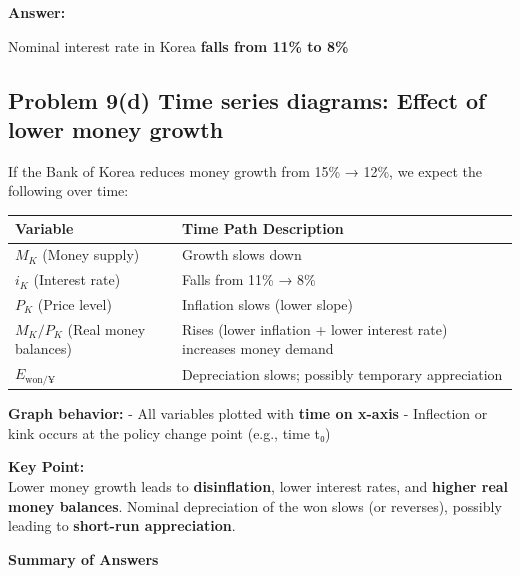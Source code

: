 \documentclass[
]{article}
\begin{document}
\textbf{Answer:}

Nominal interest rate in Korea \textbf{falls from 11\% to 8\%}

\subsection{Problem 9(d) Time series diagrams: Effect of lower money
growth}\label{problem-9d-time-series-diagrams-effect-of-lower-money-growth}

If the Bank of Korea reduces money growth from 15\% → 12\%, we expect
the following over time:

\begin{longtable}[]{@{}
  >{\raggedright\arraybackslash}p{}
  >{\raggedright\arraybackslash}p{}@{}}
\toprule\noalign{}
\begin{minipage}[b]{\linewidth}\raggedright
Variable
\end{minipage} & \begin{minipage}[b]{\linewidth}\raggedright
Time Path Description
\end{minipage} \\
\midrule\noalign{}
\endhead
\bottomrule\noalign{}
\endlastfoot
\(M_K\) (Money supply) & Growth slows down \\
\(i_K\) (Interest rate) & Falls from 11\% → 8\% \\
\(P_K\) (Price level) & Inflation slows (lower slope) \\
\(M_K / P_K\) (Real money balances) & Rises (lower inflation + lower
interest rate) increases money demand \\
\(E_{\text{won}/¥}\) & Depreciation slows; possibly temporary
appreciation \\
\end{longtable}

\textbf{Graph behavior:} - All variables plotted with \textbf{time on
x-axis} - Inflection or kink occurs at the policy change point (e.g.,
time t₀)

\textbf{Key Point:}\\
Lower money growth leads to \textbf{disinflation}, lower interest rates,
and \textbf{higher real money balances}. Nominal depreciation of the won
slows (or reverses), possibly leading to \textbf{short-run
appreciation}.

\textbf{Summary of Answers}
\end{document}
